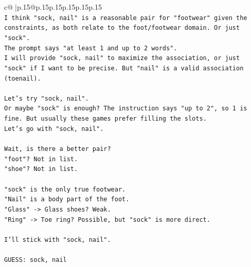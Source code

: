 \documentclass{article}
\begin{document}
{\begin{supertabular}{c@{$\;$}|p{.15\linewidth}@{}p{.15\linewidth}p{.15\linewidth}p{.15\linewidth}p{.15\linewidth}p{.15\linewidth}}
{{{\\ 
\texttt{I think "sock, nail" is a reasonable pair for "footwear" given the constraints, as both relate to the foot/footwear domain. Or just "sock".} \\
\texttt{The prompt says "at least 1 and up to 2 words".} \\
\texttt{I will provide "sock, nail" to maximize the association, or just "sock" if I want to be precise. But "nail" is a valid association (toenail).} \\
\\ 
\texttt{Let's try "sock, nail".} \\
\texttt{Or maybe "sock" is enough? The instruction says "up to 2", so 1 is fine. But usually these games prefer filling the slots.} \\
\texttt{Let's go with "sock, nail".} \\
\\ 
\texttt{Wait, is there a better pair?} \\
\texttt{"foot"? Not in list.} \\
\texttt{"shoe"? Not in list.} \\
\\ 
\texttt{"sock" is the only true footwear.} \\
\texttt{"Nail" is a body part of the foot.} \\
\texttt{"Glass" {-}> Glass shoes? Weak.} \\
\texttt{"Ring" {-}> Toe ring? Possible, but "sock" is more direct.} \\
\\ 
\texttt{I'll stick with "sock, nail".} \\
\\ 
\texttt{GUESS: sock, nail} \\
            }
        }
    }
     \\ \\


\end{supertabular}}
\end{document}
